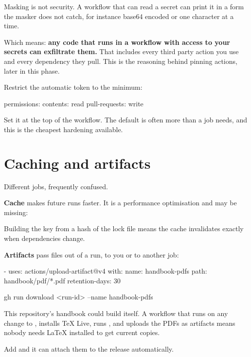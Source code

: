 \documentclass[11pt]{article}
\begin{document}
\begin{trap}
Masking is not security. A workflow that can read a secret can print it in a form
the masker does not catch, for instance base64 encoded or one character at a time.

Which means: \textbf{any code that runs in a workflow with access to your secrets can
exfiltrate them.} That includes every third party action you use and every
dependency they pull. This is the reasoning behind pinning actions, later in this
phase.
\end{trap}

Restrict the automatic token to the minimum:

\begin{terminal}
permissions:
  contents: read
  pull-requests: write
\end{terminal}

Set it at the top of the workflow. The default is often more than a job needs, and
this is the cheapest hardening available.

\section{Caching and artifacts}

Different jobs, frequently confused.

\textbf{Cache} makes future runs faster. It is a performance optimisation and may be
missing:


Building the key from a hash of the lock file means the cache invalidates exactly
when dependencies change.

\textbf{Artifacts} pass files out of a run, to you or to another job:

\begin{terminal}
- uses: actions/upload-artifact@v4
  with:
    name: handbook-pdfs
    path: handbook/pdf/*.pdf
    retention-days: 30
\end{terminal}

\begin{shell}
gh run download <run-id> --name handbook-pdfs
\end{shell}

\begin{tryit}
This repository's handbook could build itself. A workflow that runs on any change to
, installs TeX Live, runs , and uploads the
PDFs as artifacts means nobody needs LaTeX installed to get current copies.

Add  and it can attach them to the release automatically.
\end{tryit}
\end{document}
